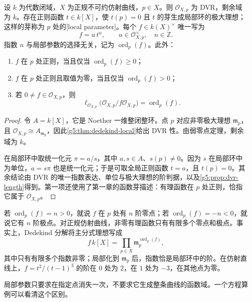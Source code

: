 \begin{proposition}
\label{g5:prop:normal-curve-parameters}
	设 \(k\) 为代数闭域，\(X\) 为正规不可约仿射曲线，\(p\in X\)。则 \(\mathcal O_{X,p}\) 为 DVR，剩余域为 \(k\)。存在正则函数 \(t\in k[X]\)，使 \(t(p)=0\) 且 \(t\) 的芽生成局部环的极大理想；这样的芽称为 \(p\) 处的[local parameter]。每个 \(f\in k(X)^\times\) 唯一写为
	\[
		f=u\,t^n,\qquad u\in\mathcal O_{X,p}^{\times},\quad n\in\mathbb Z.
	\]
	指数 \(n\) 与局部参数的选择无关，记为 \(\operatorname{ord}_p(f)\)。此外：
	\begin{enumerate}
		\item \(f\) 在 \(p\) 处正则，当且仅当 \(\operatorname{ord}_p(f)\geq0\)；
		\item \(f\) 在 \(p\) 处正则且取值为零，当且仅当 \(\operatorname{ord}_p(f)>0\)；
		\item 若 \(0\ne f\in\mathcal O_{X,p}\)，则
		\[
			\ell_{\mathcal O_{X,p}}\bigl(\mathcal O_{X,p}/f\mathcal O_{X,p}\bigr)
			=\operatorname{ord}_p(f).
		\]
	\end{enumerate}
\end{proposition}
\begin{proof}
	令 \(A=k[X]\)，它是 Noether 一维整闭整环。点 \(p\) 对应非零极大理想 \(\mathfrak m_p\)，且 \(\mathcal O_{X,p}\cong A_{\mathfrak m_p}\)，因此\cref{g5:thm:dedekind-local}给出 DVR 性。由弱零点定理，剩余域为 \(k\)。

	在局部环中取统一化元 \(\pi=a/s\)，其中 \(a,s\in A\)、\(s(p)\ne0\)。因为 \(s\) 在局部环中为单位，\(a=s\pi\) 也是统一化元；于是可取全局正则函数 \(t=a\)，且 \(t(p)=0\)。其余结论由 DVR 的唯一指数表达、单位与极大理想的阶判据，以及\cref{g5:prop:dvr-length}得到。第一项还使用了第一章的函数芽描述：有理函数在 \(p\) 处正则，恰指它属于 \(\mathcal O_{X,p}\)。
\end{proof}

若 \(\operatorname{ord}_p(f)=n>0\)，就说 \(f\) 在 \(p\) 处有 \(n\) 阶零点；若 \(\operatorname{ord}_p(f)=-n<0\)，就说它有 \(n\) 阶极点。对正规仿射曲线，非零有理函数只有有限多个零点和极点。事实上，Dedekind 分解将主分式理想写成
\[
	f\,k[X]=\prod_{p\in X}\mathfrak m_p^{\operatorname{ord}_p(f)},
\]
其中只有有限多个指数非零；局部化到 \(\mathfrak m_p\) 后，指数恰是局部环中的阶。在仿射直线上，\(f=t^2/(t-1)^3\) 的阶在 \(0\) 处为 \(2\)，在 \(1\) 处为 \(-3\)，在其他点为零。

\ProseParagraphBreak

局部参数只要求在指定点消失一次，不要求它生成整条曲线的函数域。一个方程算例可以看清这个区别。

